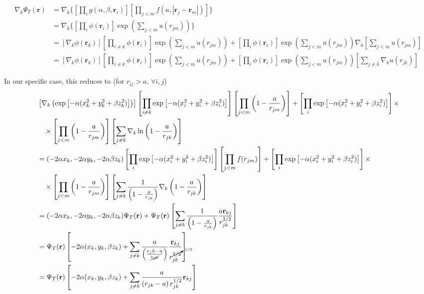 \documentclass{article}
\begin{document}
\begin{align*}
    \nabla_k\Psi_T(\mathbf{r}) &= \nabla_k \bigg\{ \left[ \prod_i g(\alpha,\beta,\mathbf{r}_i) \right]
    \left[ \prod_{j<m}f(a,|\mathbf{r}_j-\mathbf{r}_m|) \right] \bigg\} \\
    &= \nabla_k \bigg\{ \left[ \prod_i \phi(\mathbf{r}_i) \right] \exp{\left(\sum_{j<m}u(r_{jm})\right)} \bigg\} \\
    &= \left[ \nabla_k \phi(\mathbf{r}_k) \right] \left[ \prod_{i \neq k} \phi(\mathbf{r}_i) \right] \exp{\left(\sum_{j<m}u(r_{jm})\right)} + \left[\prod_i \phi(\mathbf{r}_i)  \right] \exp{\left(\sum_{j<m} u(r_{jm}) \right)} \nabla_k \left[ \sum_{j<m} u(r_{jm}) \right] \\
    &= \left[ \nabla_k \phi(\mathbf{r}_k) \right] \left[ \prod_{i \neq k} \phi(\mathbf{r}_i) \right] \exp{\left(\sum_{j<m}u(r_{jm})\right)} + \left[\prod_i \phi(\mathbf{r}_i) \right] \exp{\left(\sum_{j<m} u(r_{jm}) \right)} \left[ \sum_{j\neq k} \nabla_k u(r_{jk}) \right]
\end{align*}

In our specific case, this reduces to (for $r_{ij}>a,\, \forall i,j$)
\begin{align*}
    &\left[ \nabla_k 
    \left( \exp{ \left[ -\alpha(x_k^2 + y_k^2 + \beta z_k^2) \right]} \right) \right] \left[ \prod_{i \neq k} \exp{ \left[ -\alpha(x_i^2 + y_i^2 + \beta z_i^2) \right] } \right] \left[ \prod_{j<m} \left( 1 - \frac{a}{r_{jm}} \right) \right] +  \left[\prod_i \exp{ \left[ -\alpha (x_i^2 + y_i^2 + \beta z_i^2) \right]} \right] \times \\
    &\quad \times \left[\prod_{j<m} \left( 1 - \frac{a}{r_{jm}} \right) \right] \left[ \sum_{j\neq k} \nabla_k \ln \left( 1 - \frac{a}{r_{jk}} \right) \right] \\
    &= (-2\alpha x_k, -2\alpha y_k, -2\alpha\beta z_k) \left[ \prod_i \exp{ \left[ -\alpha(x_i^2 + y_i^2 + \beta z_i^2) \right] } \right] \left[ \prod_{j<m} f(r_{jm}) \right] +  \left[ \prod_i \exp{ \left[ -\alpha(x_i^2 + y_i^2 + \beta z_i^2) \right] } \right] \times \\
    &\quad \times \left[\prod_{j<m} \left( 1 - \frac{a}{r_{jm}} \right) \right] \left[ \sum_{j\neq k} \frac{1}{\left( 1 - \frac{a}{r_{jk}} \right)} \nabla_k \left( 1 - \frac{a}{r_{jk}} \right) \right] \\
    &= (-2\alpha x_k, -2\alpha y_k, -2\alpha\beta z_k) \Psi_T(\mathbf{r}) + \Psi_T(\mathbf{r}) \left[ \sum_{j\neq k} \frac{1}{\left( 1 - \frac{a}{r_{jk}} \right)} \frac{a \mathbf{r}_{kj}}{r_{jk}^{3/2}} \right] \\
    &= \Psi_T(\mathbf{r}) \left[ -2\alpha (x_k, y_k, \beta z_k) + \sum_{j\neq k} \frac{a}{\left( \frac{r_jk - a}{\cancel{r_{jk}}} \right)} \frac{\mathbf{r}_{kj}}{r_{jk}^{\cancelto{1/2}{3/2}}} \right] \\
    &= \Psi_T(\mathbf{r}) \left[ -2\alpha (x_k, y_k, \beta z_k) + \sum_{j\neq k} \frac{a}{\left( r_{jk} - a \right) r_{jk}^{1/2}} \mathbf{r}_{kj} \right]
\end{align*}
\end{document}
